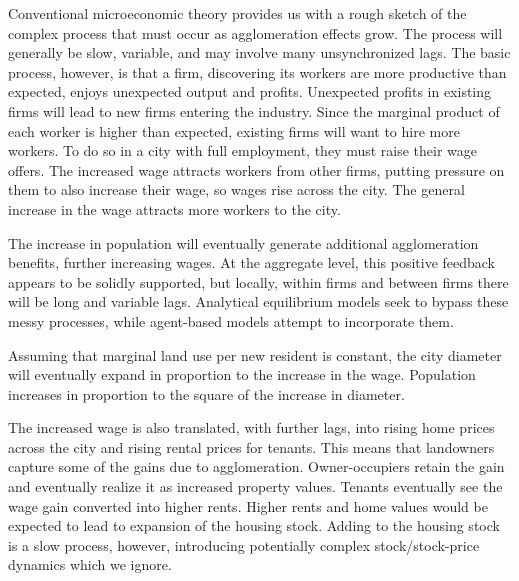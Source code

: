 Conventional microeconomic theory  provides us with a rough sketch of the complex process that must occur as agglomeration effects grow. The process will generally be slow, variable, and may involve many unsynchronized lags. The basic process, however, is that a firm, discovering its workers are  more productive than expected, enjoys unexpected output and profits. Unexpected profits in existing firms will lead to new firms entering the industry. Since the marginal product of each worker is higher than expected, existing firms will  want to hire more workers. To do so in a city with full employment, they must raise their  wage offers.   The increased wage attracts workers from other firms, putting pressure on them to also increase their wage, so wages rise across the city. The general increase in the wage attracts more workers to the city.

The increase in population will eventually generate additional agglomeration benefits, further increasing wages. At the aggregate level, this positive feedback appears to be solidly supported, but locally, within firms and between firms there will be long and variable lags. Analytical equilibrium models seek to bypass these messy processes, while agent-based models attempt to incorporate them.

Assuming that marginal land use per new resident is constant, the city diameter will eventually expand in proportion to the increase in the wage.%
Population increases in proportion to the square of the increase in diameter. %

The increased wage is also translated, with further lags, into rising home prices across the city and rising rental prices for tenants. This means that landowners capture some of the gains due to agglomeration. Owner-occupiers retain the gain and eventually realize it as increased  property values. Tenants eventually see the wage gain converted into higher rents. Higher rents and home values would be expected to lead to expansion of the housing stock. Adding to the housing stock is a slow process, however, introducing potentially complex stock/stock-price dynamics which we ignore.


